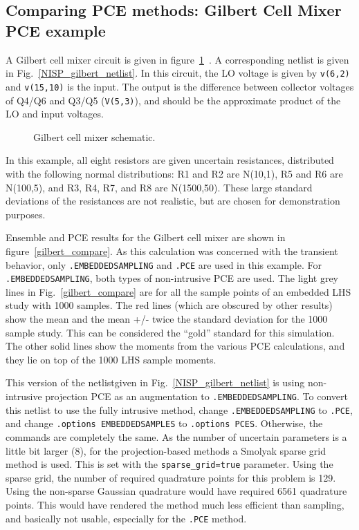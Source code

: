\clearpage
\subsection{Comparing PCE methods: Gilbert Cell Mixer PCE example}
\label{xyceGilbertCell}
A Gilbert cell mixer circuit is given in figure~\ref{gilbert}~\cite{1049925}.  A corresponding netlist 
is given in Fig.~\ref{NISP_gilbert_netlist}.
In this circuit, the LO voltage is given by \texttt{v(6,2)} and \texttt{v(15,10)} is the input. 
The output is the difference between collector voltages of Q4/Q6 and Q3/Q5 (\texttt{V(5,3)}), 
and should be the approximate product of the LO and input voltages.
\begin{figure}[hbt]
\centering
\resizebox{.9\linewidth}{!}{ }
  \caption[Gilbert cell mixer schematic]
  {Gilbert cell mixer schematic.}
\label{gilbert}
\end{figure}
In this example, all eight 
resistors are given uncertain resistances, distributed with the following normal distributions:  R1 and R2 are N(10,1), 
R5 and R6 are N(100,5), and R3, R4, R7, and R8 are N(1500,50).  These large standard deviations of the resistances are 
not realistic, but are chosen for demonstration purposes.

Ensemble and PCE results for the Gilbert cell mixer are shown in figure~\ref{gilbert_compare}.   
As this calculation was concerned with the transient behavior, only \texttt{.EMBEDDEDSAMPLING} 
and \texttt{.PCE} are used in this example.  For \texttt{.EMBEDDEDSAMPLING}, both types of 
non-intrusive PCE are used.
The light grey lines in Fig.~\ref{gilbert_compare} are for all the sample points 
of an embedded LHS study with 1000 samples.    The red lines (which are obscured 
by other results) show the mean and the mean +/- twice the standard deviation for the 
1000 sample study.  This can be considered the ``gold'' standard for this simulation.
The other solid lines show the moments from the various PCE calculations, and they 
lie on top of the 1000 LHS sample moments.  

This version of the netlistgiven in Fig.~\ref{NISP_gilbert_netlist}
is using non-intrusive projection PCE as an augmentation to \texttt{.EMBEDDEDSAMPLING}.  
To convert this netlist to 
use the fully intrusive method, change \texttt{.EMBEDDEDSAMPLING} to \texttt{.PCE}, and 
change \texttt{.options EMBEDDEDSAMPLES} to \texttt{.options PCES}.   Otherwise, the commands are completely the same.
As the number of uncertain parameters is a little bit larger (8), for the projection-based methods a 
Smolyak sparse grid~\cite{Smolyak_63} method is used.  This is set with the  \texttt{sparse\_grid=true} parameter. 
Using the sparse grid, the number of 
required quadrature points for this problem is 129.  Using the non-sparse Gaussian quadrature 
would have required 6561 quadrature points. This would have rendered the method much 
less efficient than sampling, and basically not usable, especially for the \texttt{.PCE} method.


